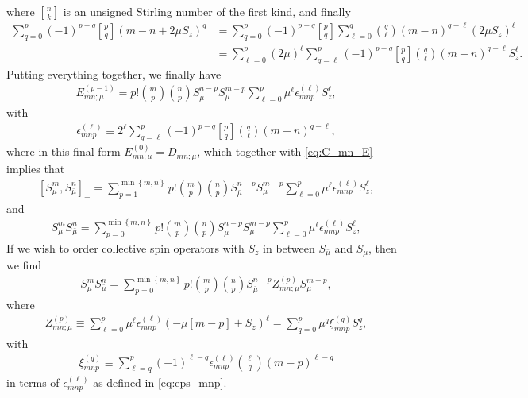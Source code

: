 \documentclass[aps,notitlepage,nofootinbib,11pt]{revtex4-1}
\newcommand{\p}[1]{\left(#1\right)} %
\renewcommand{\sp}[1]{\left[#1\right]} %
\renewcommand{\set}[1]{\left\{#1\right\}} %
\newcommand{\bmu}{{\bar\mu}}
\newcommand{\1}{\mathds{1}}
\begin{document}
where ${ n \brack k }$ is an unsigned Stirling number of the first
kind, and finally
\begin{align}
  \sum_{q=0}^p \p{-1}^{p-q} { p \brack q } \p{m-n+2\mu S_z}^q
  &= \sum_{q=0}^p \p{-1}^{p-q} { p \brack q } \sum_{\ell=0}^q
  { q \choose \ell } \p{m-n}^{q-\ell} \p{2\mu S_z}^\ell \\
  &= \sum_{\ell=0}^p \p{2\mu}^\ell \sum_{q=\ell}^p \p{-1}^{p-q}
  { p \brack q } { q \choose \ell } \p{m-n}^{q-\ell} S_z^\ell.
\end{align}
Putting everything together, we finally have
\begin{align}
  E_{mn;\mu}^{(p-1)}
  = p! { m \choose p } { n \choose p }
  S_\bmu^{n-p} S_\mu^{m-p} \sum_{\ell=0}^p
  \mu^\ell \epsilon_{mnp}^{(\ell)} S_z^\ell,
\end{align}
with
\begin{align}
  \epsilon_{mnp}^{(\ell)}
  \equiv 2^\ell \sum_{q=\ell}^p \p{-1}^{p-q}
  { p \brack q } { q \choose \ell } \p{m-n}^{q-\ell},
  \label{eq:eps_mnp}
\end{align}
where in this final form $E_{mn;\mu}^{(0)} = D_{mn;\mu}$, which
together with \eqref{eq:C_mn_E} implies that
\begin{align}
  \sp{S_\mu^m, S_\bmu^n}_-
  = \sum_{p=1}^{\min\set{m,n}}
  p! { m \choose p } { n \choose p } S_\bmu^{n-p} S_\mu^{m-p}
  \sum_{\ell=0}^p \mu^\ell \epsilon_{mnp}^{(\ell)} S_z^\ell,
  \label{eq:comm_mu}
\end{align}
and
\begin{align}
  S_\mu^m S_\bmu^n
  = \sum_{p=0}^{\min\set{m,n}}
  p! { m \choose p } { n \choose p } S_\bmu^{n-p} S_\mu^{m-p}
  \sum_{\ell=0}^p \mu^\ell \epsilon_{mnp}^{(\ell)} S_z^\ell,
  \label{eq:push_mu_nu}
\end{align}
If we wish to order collective spin operators with $S_z$ in between
$S_\bmu$ and $S_\mu$, then we find
\begin{align}
  S_\mu^m S_\bmu^n
  = \sum_{p=0}^{\min\set{m,n}} p! { m \choose p } { n \choose p }
  S_\bmu^{n-p} Z_{mn;\mu}^{(p)} S_\mu^{m-p},
\end{align}
where
\begin{align}
  Z_{mn;\mu}^{(p)}
  \equiv \sum_{\ell=0}^p \mu^\ell \epsilon_{mnp}^{(\ell)}
  \p{-\mu\sp{m-p} + S_z}^\ell
  = \sum_{q=0}^p \mu^q \xi_{mnp}^{(q)} S_z^q,
  \label{eq:Z_mn}
\end{align}
with
\begin{align}
  \xi_{mnp}^{(q)}
  \equiv \sum_{\ell=q}^p \p{-1}^{\ell-q}
  \epsilon_{mnp}^{(\ell)} { \ell \choose q } \p{m-p}^{\ell-q}
  \label{eq:xi_mnp}
\end{align}
in terms of $\epsilon_{mnp}^{(\ell)}$ as defined in
\eqref{eq:eps_mnp}.
\end{document}
